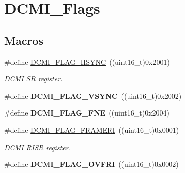 \hypertarget{group___d_c_m_i___flags}{\section{D\-C\-M\-I\-\_\-\-Flags}
\label{group___d_c_m_i___flags}
}
\subsection*{Macros}
\begin{DoxyCompactItemize}
\item 
\hypertarget{group___d_c_m_i___flags_gaf0137c6fe1d4f62e3197a1525ccd4576}{\#define \hyperlink{group___d_c_m_i___flags_gaf0137c6fe1d4f62e3197a1525ccd4576}{D\-C\-M\-I\-\_\-\-F\-L\-A\-G\-\_\-\-H\-S\-Y\-N\-C}~((uint16\-\_\-t)0x2001)}\label{group___d_c_m_i___flags_gaf0137c6fe1d4f62e3197a1525ccd4576}

\begin{DoxyCompactList}\small\item\em D\-C\-M\-I S\-R register. \end{DoxyCompactList}\item 
\hypertarget{group___d_c_m_i___flags_ga7ae4108d63dc1148222a50f84fd3af4f}{\#define {\bfseries D\-C\-M\-I\-\_\-\-F\-L\-A\-G\-\_\-\-V\-S\-Y\-N\-C}~((uint16\-\_\-t)0x2002)}\label{group___d_c_m_i___flags_ga7ae4108d63dc1148222a50f84fd3af4f}

\item 
\hypertarget{group___d_c_m_i___flags_ga9fe6ca35ea558baf07ff85cc6d9d3394}{\#define {\bfseries D\-C\-M\-I\-\_\-\-F\-L\-A\-G\-\_\-\-F\-N\-E}~((uint16\-\_\-t)0x2004)}\label{group___d_c_m_i___flags_ga9fe6ca35ea558baf07ff85cc6d9d3394}

\item 
\hypertarget{group___d_c_m_i___flags_gab882a0ef2f660db5dcd1d12eff39f653}{\#define \hyperlink{group___d_c_m_i___flags_gab882a0ef2f660db5dcd1d12eff39f653}{D\-C\-M\-I\-\_\-\-F\-L\-A\-G\-\_\-\-F\-R\-A\-M\-E\-R\-I}~((uint16\-\_\-t)0x0001)}\label{group___d_c_m_i___flags_gab882a0ef2f660db5dcd1d12eff39f653}

\begin{DoxyCompactList}\small\item\em D\-C\-M\-I R\-I\-S\-R register. \end{DoxyCompactList}\item 
\hypertarget{group___d_c_m_i___flags_ga10e986f24ca3e73d31f56ddd908987e0}{\#define {\bfseries D\-C\-M\-I\-\_\-\-F\-L\-A\-G\-\_\-\-O\-V\-F\-R\-I}~((uint16\-\_\-t)0x0002)}\label{group___d_c_m_i___flags_ga10e986f24ca3e73d31f56ddd908987e0}


\end{DoxyCompactItemize}
